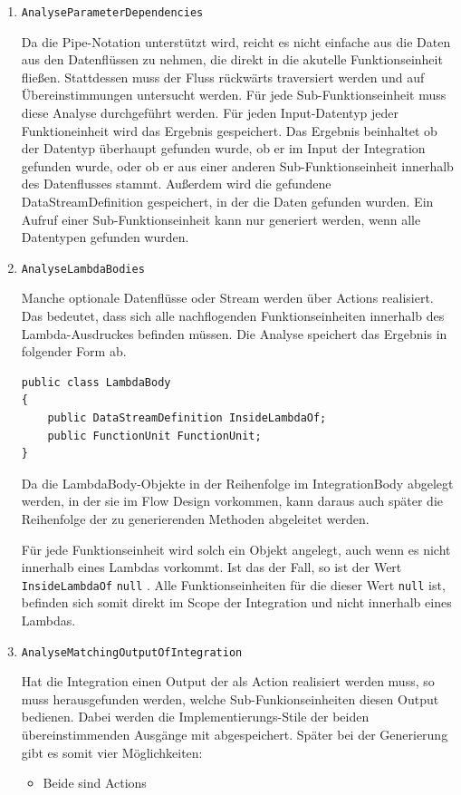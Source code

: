 	\begin{enumerate}
		\item \texttt{AnalyseParameterDependencies}

		Da die Pipe-Notation unterstützt wird, reicht es nicht einfache aus die Daten
		aus den Datenflüssen zu nehmen, die direkt in die akutelle
		Funktionseinheit fließen. Stattdessen muss der Fluss rückwärts
		traversiert werden und auf Übereinstimmungen untersucht werden.
		Für jede Sub-Funktionseinheit muss diese Analyse durchgeführt werden.
		Für jeden Input-Datentyp jeder Funktioneinheit wird das Ergebnis gespeichert. Das Ergebnis beinhaltet ob der Datentyp überhaupt gefunden
		wurde, ob er im Input der Integration gefunden wurde, oder ob er aus einer
		anderen Sub-Funktionseinheit innerhalb des Datenflusses stammt. 
		Außerdem wird die gefundene DataStreamDefinition gespeichert, in der die
		Daten gefunden wurden. Ein Aufruf einer Sub-Funktionseinheit kann nur generiert werden, wenn alle Datentypen gefunden
		wurden.
		
		\item \texttt{AnalyseLambdaBodies}

		Manche optionale Datenflüsse oder Stream werden über Actions realisiert.
		Das bedeutet, dass sich alle nachflogenden Funktionseinheiten innerhalb
		des Lambda-Ausdruckes befinden müssen. Die Analyse speichert das Ergebnis
		in folgender Form ab. 
		
		\begin{lstlisting}[caption=LambdaBody Klasse]
public class LambdaBody
{
	public DataStreamDefinition InsideLambdaOf;
	public FunctionUnit FunctionUnit;
}
		\end{lstlisting}
		
		Da die LambdaBody-Objekte in der Reihenfolge im IntegrationBody abgelegt
		werden, in der sie im Flow Design vorkommen, kann daraus auch später die
		Reihenfolge der zu generierenden Methoden abgeleitet werden.
		
		
		Für jede Funktionseinheit wird solch ein Objekt angelegt, auch wenn es
		nicht innerhalb eines Lambdas vorkommt. Ist das der Fall, so ist der Wert
		\texttt{InsideLambdaOf} \texttt{null} . Alle Funktionseinheiten für die dieser Wert
		\texttt{null} ist, befinden sich somit direkt im Scope der Integration und nicht
		innerhalb eines Lambdas.
		
		\item \texttt{AnalyseMatchingOutputOfIntegration}

		Hat die Integration einen Output der als Action realisiert werden muss, so
		muss herausgefunden werden, welche Sub-Funkionseinheiten diesen
		Output bedienen. Dabei werden die Implementierungs-Stile der
		beiden übereinstimmenden Ausgänge mit abgespeichert. Später bei der
		Generierung gibt es somit vier Möglichkeiten:
		\begin{itemize}
			\item Beide sind Actions
			

\end{itemize}
\end{enumerate}
